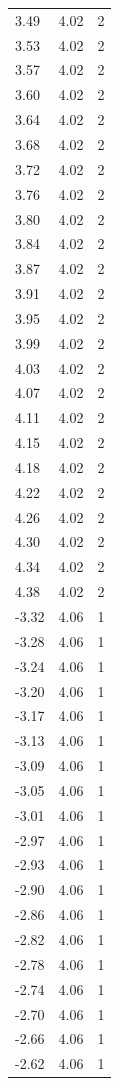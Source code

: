 \begin{longtable}{lrr}
  3.49 & 4.02 & 2 \\
  3.53 & 4.02 & 2 \\
  3.57 & 4.02 & 2 \\
  3.60 & 4.02 & 2 \\
  3.64 & 4.02 & 2 \\
  3.68 & 4.02 & 2 \\
  3.72 & 4.02 & 2 \\
  3.76 & 4.02 & 2 \\
  3.80 & 4.02 & 2 \\
  3.84 & 4.02 & 2 \\
  3.87 & 4.02 & 2 \\
  3.91 & 4.02 & 2 \\
  3.95 & 4.02 & 2 \\
  3.99 & 4.02 & 2 \\
  4.03 & 4.02 & 2 \\
  4.07 & 4.02 & 2 \\
  4.11 & 4.02 & 2 \\
  4.15 & 4.02 & 2 \\
  4.18 & 4.02 & 2 \\
  4.22 & 4.02 & 2 \\
  4.26 & 4.02 & 2 \\
  4.30 & 4.02 & 2 \\
  4.34 & 4.02 & 2 \\
  4.38 & 4.02 & 2 \\
  -3.32 & 4.06 & 1 \\
  -3.28 & 4.06 & 1 \\
  -3.24 & 4.06 & 1 \\
  -3.20 & 4.06 & 1 \\
  -3.17 & 4.06 & 1 \\
  -3.13 & 4.06 & 1 \\
  -3.09 & 4.06 & 1 \\
  -3.05 & 4.06 & 1 \\
  -3.01 & 4.06 & 1 \\
  -2.97 & 4.06 & 1 \\
  -2.93 & 4.06 & 1 \\
  -2.90 & 4.06 & 1 \\
  -2.86 & 4.06 & 1 \\
  -2.82 & 4.06 & 1 \\
  -2.78 & 4.06 & 1 \\
  -2.74 & 4.06 & 1 \\
  -2.70 & 4.06 & 1 \\
  -2.66 & 4.06 & 1 \\
  -2.62 & 4.06 & 1 \\

\end{longtable}
